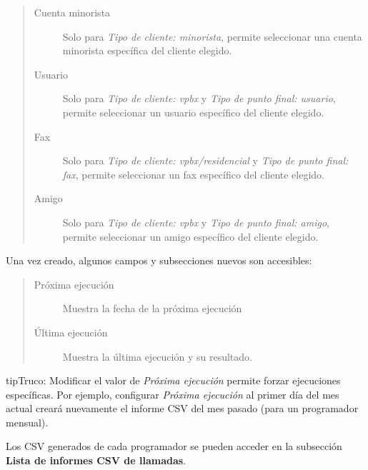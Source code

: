 \documentclass[letterpaper,10pt,spanish]{sphinxmanual}
\begin{document}
\begin{quote}
\begin{description}
\item[{Cuenta minorista}] \leavevmode
Solo para \emph{Tipo de cliente: minorista}, permite seleccionar una cuenta minorista específica del cliente elegido.

\item[{Usuario}] \leavevmode
Solo para \emph{Tipo de cliente: vpbx} y \emph{Tipo de punto final: usuario}, permite seleccionar un usuario específico del cliente elegido.

\item[{Fax}] \leavevmode
Solo para \emph{Tipo de cliente: vpbx/residencial} y \emph{Tipo de punto final: fax}, permite seleccionar un fax específico del cliente elegido.

\item[{Amigo}] \leavevmode
Solo para \emph{Tipo de cliente: vpbx} y \emph{Tipo de punto final: amigo}, permite seleccionar un amigo específico del cliente elegido.

\end{description}
\end{quote}

Una vez creado, algunos campos y subsecciones nuevos son accesibles:
\begin{quote}
\begin{description}
\item[{Próxima ejecución}] \leavevmode
Muestra la fecha de la próxima ejecución

\item[{Última ejecución}] \leavevmode
Muestra la última ejecución y su resultado.

\end{description}
\end{quote}

\begin{notice}{tip}{Truco:}
Modificar el valor de \emph{Próxima ejecución} permite forzar ejecuciones específicas. Por ejemplo, configurar \emph{Próxima ejecución} al primer día del mes actual creará nuevamente el informe CSV del mes pasado (para un programador mensual).
\end{notice}

Los CSV generados de cada programador se pueden acceder en la subsección \textbf{Lista de informes CSV de llamadas}.
\end{document}
